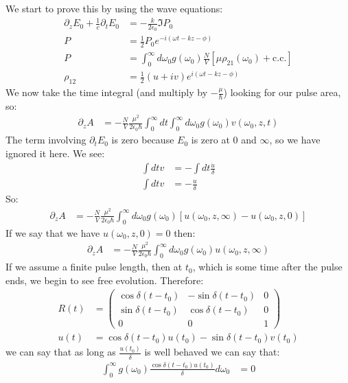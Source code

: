 We start to prove this by using the wave equations:
\begin{align*}
	\partial_z E_0 + \frac{1}{c} \partial_t E_0 &= -\frac{k}{2\epsilon_0} \Im P_0 \\
	P &= \frac{1}{2} P_0 e^{-i(\omega t - kz - \phi)} \\
	P &= \int_0^\infty d\omega_0 g(\omega_0) \frac{N}{V} \left[\mu\rho_{21}(\omega_0) +\text{c.c.}\right] \\
	\rho_{12} &= \frac{1}{2}(u + i v)e^{i(\omega t -kz -\phi)}
\end{align*}
We now take the time integral (and multiply by $-\frac{\mu}{\hbar}$) looking for our pulse area, so:
\begin{align*}
	\partial_z A &= -\frac{N}{V} \frac{\mu^2}{2\epsilon_0\hbar} \int_0^\infty dt\int_0^\infty d\omega_0 g(\omega_0)v(\omega_0,z,t)
\end{align*}
The term involving $\partial_t E_0$ is zero because $E_0$ is zero at 0 and $\infty$, so we have ignored it here. We see:
\begin{align*}
	\int dt v &= -\int dt \frac{\dot{u}}{\delta} \\
	\int dt v &= -\frac{u}{\delta}
\end{align*}
So:
\begin{align*}
	\partial_z A &= -\frac{N}{V} \frac{\mu^2}{2\epsilon_0\hbar} \int_0^\infty d\omega_0 g(\omega_0)\left[u(\omega_0,z,\infty) - u(\omega_0,z,0)\right]
\end{align*}
If we say that we have $u(\omega_0,z,0) = 0$ then:
\begin{align*}
	\partial_z A &= -\frac{N}{V} \frac{\mu^2}{2\epsilon_0\hbar} \int_0^\infty d\omega_0 g(\omega_0)u(\omega_0,z,\infty)
\end{align*}
If we assume a finite pulse length, then at $t_0$, which is some time after the pulse ends, we begin to see free evolution. Therefore:
\begin{align*}
	R(t) &= \begin{pmatrix}
		\cos \delta(t-t_0) & -\sin\delta(t-t_0) & 0 \\ 
		\sin \delta(t-t_0) & \cos\delta(t-t_0) & 0 \\ 
		0 & 0 & 1
		\end{pmatrix} \\
	u(t) &= \cos \delta (t-t_0) u(t_0) - \sin\delta(t-t_0) v(t_0)
\end{align*}
we can say that as long as $\frac{u(t_0)}{\delta}$ is well behaved we can say that:
\begin{align*}
	\int_0^\infty g(\omega_0) \frac{\cos\delta(t-t_0)u(t_0)}{\delta} d\omega_0 &= 0
\end{align*}
